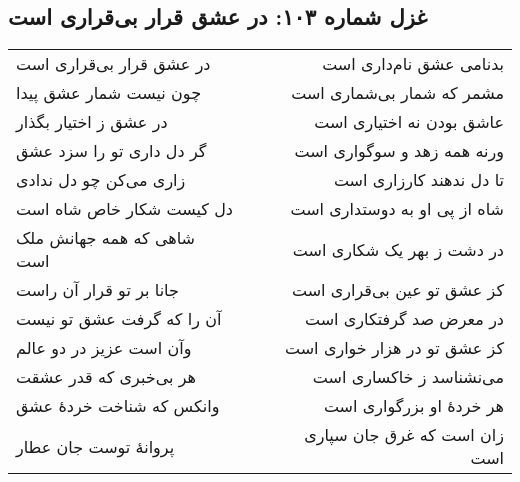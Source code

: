 \begin{center}
\section*{غزل شماره ۱۰۳: در عشق قرار بی‌قراری است}
\label{sec:103}
\begin{longtable}{l p{0.5cm} r}
در عشق قرار بی‌قراری است
&&
بدنامی عشق نام‌داری است
\\
چون نیست شمار عشق پیدا
&&
مشمر که شمار بی‌شماری است
\\
در عشق ز اختیار بگذار
&&
عاشق بودن نه اختیاری است
\\
گر دل داری تو را سزد عشق
&&
ورنه همه زهد و سوگواری است
\\
زاری می‌کن چو دل ندادی
&&
تا دل ندهند کارزاری است
\\
دل کیست شکار خاص شاه است
&&
شاه از پی او به دوستداری است
\\
شاهی که همه جهانش ملک است
&&
در دشت ز بهر یک شکاری است
\\
جانا بر تو قرار آن راست
&&
کز عشق تو عین بی‌قراری است
\\
آن را که گرفت عشق تو نیست
&&
در معرض صد گرفتکاری است
\\
وآن است عزیز در دو عالم
&&
کز عشق تو در هزار خواری است
\\
هر بی‌خبری که قدر عشقت
&&
می‌نشناسد ز خاکساری است
\\
وانکس که شناخت خردهٔ عشق
&&
هر خردهٔ او بزرگواری است
\\
پروانهٔ توست جان عطار
&&
زان است که غرق جان سپاری است
\\
\end{longtable}
\end{center}
